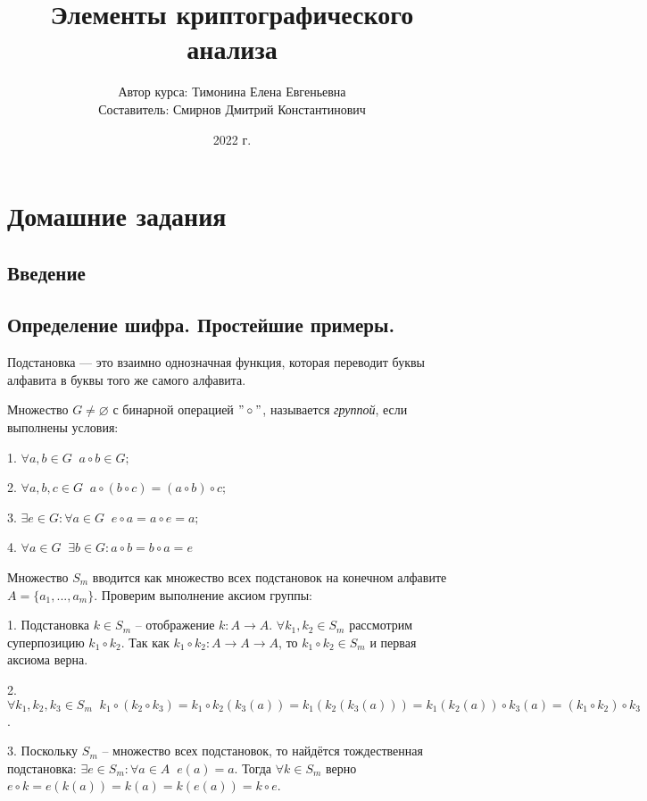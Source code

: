 \documentclass[letterpaper,11pt,openany]{book}
\title{Элементы криптографического анализа}
\author{Автор курса: Тимонина Елена Евгеньевна \\ 
		Составитель: Смирнов Дмитрий Константинович }
\date{2022 г.}
\begin{document}
\maketitle
\tableofcontents

\mainmatter

\chapter{Домашние задания}

\section{Введение}

\section{Определение шифра. Простейшие примеры.}

Подстановка — это взаимно однозначная функция, которая переводит буквы алфавита в буквы того же самого алфавита.

Множество $G \ne \varnothing$ с бинарной операцией $"\circ"$, называется \emph{группой}, если выполнены условия:

1. $ \forall a,b \in G \;\; a \circ b \in G; $

2. $ \forall a,b,c \in G \;\; a \circ (b \circ c) = (a \circ b) \circ c; $

3. $ \exists e \in G \colon \forall a \in G \;\; e \circ a = a \circ e = a;$

4. $ \forall a \in G \;\; \exists b \in G \colon a \circ b = b \circ a = e$

Множество $S_m$ вводится как множество всех подстановок на конечном алфавите $A = \{a_1, ... , a_m\} $. Проверим выполнение аксиом группы:

1. Подстановка $k \in S_m$ -- отображение $k \colon A \to A$. $\forall k_1, k_2 \in S_m $ рассмотрим суперпозицию $k_1 \circ k_2$. Так как $k_1 \circ k_2 \colon A \to A \to A$, то $k_1 \circ k_2 \in S_m $ и первая аксиома верна.

2. $\forall k_1, k_2, k_3 \in S_m \;\; k_1 \circ (k_2 \circ k_3) = k_1 \circ k_2 ( k_3 (a)) = k_1 ( k_2 ( k_3 (a))) = k_1 ( k_2 (a)) \circ k_3 (a) = (k_1 \circ k_2) \circ k_3$.

3. Поскольку $S_m$ -- множество всех подстановок, то найдётся тождественная подстановка: $\exists e \in S_m \colon \forall a \in A \;\; e(a) = a$. Тогда $\forall k \in S_m $ верно $e \circ k = e(k(a)) = k(a) = k(e(a)) = k \circ e$.
\end{document}
